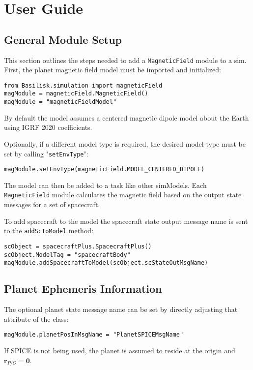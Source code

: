 
\section{User Guide}

\subsection{General Module Setup}
This section outlines the steps needed to add a {\tt MagneticField} module to a sim.
First, the planet magnetic field model must be imported and initialized:
\begin{verbatim}
from Basilisk.simulation import magneticField
magModule = magneticField.MagneticField()
magModule = "magneticFieldModel"
\end{verbatim}
By default the model assumes a centered magnetic dipole model about the Earth using IGRF 2020 coefficients.

Optionally, if a different model type is required, the desired model type must be set by calling "\verb|setEnvType|":
\begin{verbatim}
magModule.setEnvType(magneticField.MODEL_CENTERED_DIPOLE)
\end{verbatim}

The model can then be added to a task like other simModels. Each {\tt MagneticField} module calculates the magnetic field based on the output state messages for a set of spacecraft.

To add spacecraft to the model the spacecraft state output message name is sent to the \verb|addScToModel| method:
\begin{verbatim}
scObject = spacecraftPlus.SpacecraftPlus()
scObject.ModelTag = "spacecraftBody"
magModule.addSpacecraftToModel(scObject.scStateOutMsgName)
\end{verbatim}

\subsection{Planet Ephemeris Information}
The optional planet state message name can be set by directly adjusting that attribute of the class:
\begin{verbatim}
magModule.planetPosInMsgName = "PlanetSPICEMsgName"
\end{verbatim}
If SPICE is not being used, the planet is assumed to reside at the origin and $\bm r_{P/O} = \bm 0$.

